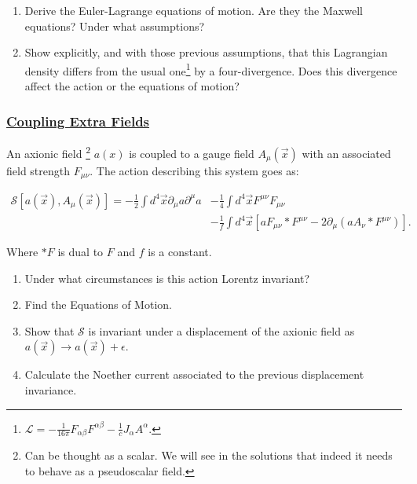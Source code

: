 \begin{enumerate}
	\item Derive the Euler-Lagrange equations of motion. Are they the Maxwell equations? Under what assumptions?
	\item Show explicitly, and with those previous assumptions, that this Lagrangian density differs from the usual one\footnote{$\mathcal{L}= -\frac{1}{16\pi} F_{\alpha\beta}F^{\alpha\beta} - \frac{1}{c}J_{\alpha}A^{\alpha}.$} by a four-divergence. Does this divergence affect the action or the equations of motion?
\end{enumerate}

\subsubsection{\hyperref[Coupling Extra Fields to amu]{Coupling Extra Fields}}

An axionic field \footnote{Can be thought as a scalar. We will see in the solutions that indeed it needs to behave as a pseudoscalar field.} $a(x)$ is coupled to a gauge field $A_{\mu}(\vec{x})$ with an associated field strength $F_{\mu \nu}$. The action describing this system goes as:

\begin{equation}\label{axionicaction}
	\begin{split}
		\mathcal{S}[a(\vec{x}),A_{\mu}(\vec{x})]=
	-\frac{1}{2}\int d^{4}\vec{x}\partial_{\mu}a \partial^{\mu}a  &- \frac{1}{4}\int d^{4}\vec{x}F^{\mu\nu}F_{\mu\nu}\\
	 &- \frac{1}{f}\int d^{4}\vec{x}\left[a F_{\mu\nu}*F^{\mu\nu} - 2 \partial_{\mu}\left(a A_{\nu}*F^{\mu\nu}\right)\right].
	\end{split}
\end{equation}

Where $*F$ is dual to $F$ and $f$ is a constant.

\begin{enumerate}
	\item Under what circumstances is this action Lorentz invariant?
	\item Find the Equations of Motion.
	\item Show that $\mathcal{S}$ is invariant under a displacement of the axionic field as $a(\vec{x})\rightarrow a(\vec{x})+ \epsilon$.
	\item Calculate the Noether current associated to the previous displacement invariance.
\end{enumerate}

